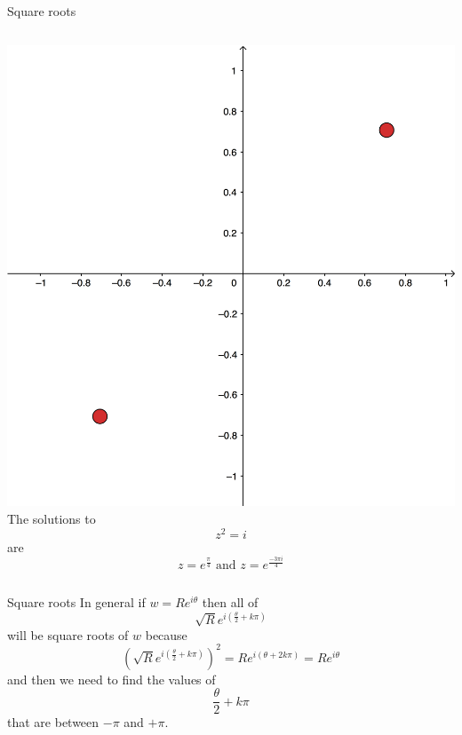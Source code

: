\documentclass{beamer}
\begin{document}
\begin{frame}{Square roots}
\begin{columns}
\includegraphics[scale=2.8]{root-i.png}
The solutions to
\begin{equation*}
	z^2 = i
\end{equation*}
are
\begin{equation*}
z=e^{\frac{\pi}{4}}\text{ and } z=e^{\frac{-3\pi i}{4}}
\end{equation*}
\end{columns}
\end{frame}

\begin{frame}{Square roots}
In general if $w = Re^{i\theta}$ then all of
\begin{equation*}
\sqrt{R}e^{i\left(\frac{\theta}{2}+k\pi\right)}
\end{equation*}
will be square roots of $w$ because
\begin{equation*}
\left(\sqrt{R}e^{i\left(\frac{\theta}{2}+k\pi\right)}\right)^2 = Re^{i\left(\theta+2k\pi\right)} = Re^{i\theta}
\end{equation*}
and then we need to find the values of 
\begin{equation*}
\frac{\theta}{2}+k\pi
\end{equation*}
that are between $-\pi$ and $+\pi$.
\end{frame}
\end{document}
